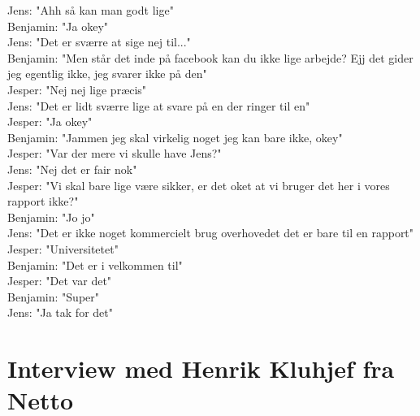 Jens: "Ahh så kan man godt lige"\\
Benjamin: "Ja okey"\\
Jens: "Det er sværre at sige nej til..."\\
Benjamin: "Men står det inde på facebook kan du ikke lige arbejde? Ejj det gider jeg egentlig ikke, jeg svarer ikke på den"\\
Jesper: "Nej nej lige præcis"\\
Jens: "Det er lidt sværre lige at svare på en der ringer til en"\\
Jesper: "Ja okey"\\
Benjamin: "Jammen jeg skal virkelig noget jeg kan bare ikke, okey"\\
Jesper: "Var der mere vi skulle have Jens?"\\
Jens: "Nej det er fair nok"\\
Jesper: "Vi skal bare lige være sikker, er det oket at vi bruger det her i vores rapport ikke?"\\
Benjamin: "Jo jo"\\
Jens: "Det er ikke noget kommercielt brug overhovedet det er bare til en rapport"\\
Jesper: "Universitetet"\\
Benjamin: "Det er i velkommen til"\\
Jesper: "Det var det"\\
Benjamin: "Super"\\
Jens: "Ja tak for det"\\

\section{Interview med Henrik Kluhjef fra Netto}\label{app:netto}

